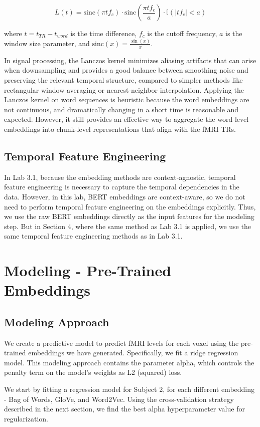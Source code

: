 \documentclass[10pt,letterpaper]{article}
\begin{document}
\[
L(t) = \text{sinc}(\pi t f_c) \cdot \text{sinc}(\frac{\pi t f_c}{a}) \cdot \mathbb{I}(|t f_c| < a)
\]

where \(t = t_{TR} - t_{word}\) is the time difference, $f_c$ is the cutoff frequency, $a$ is the window size parameter, and \(\text{sinc}(x) = \frac{\sin(x)}{x}\).

In signal processing, the Lanczos kernel minimizes aliasing artifacts that can arise when downsampling and provides a good balance between smoothing noise and preserving the relevant temporal structure, compared to simpler methods like rectangular window averaging or nearest-neighbor interpolation. Applying the Lanczos kernel on word sequences is heuristic because the word embeddings are not continuous, and dramatically changing in a short time is reasonable and expected. However, it still provides an effective way to aggregate the word-level embeddings into chunk-level representations that align with the fMRI TRs.

\subsection{Temporal Feature Engineering}
In Lab 3.1, because the embedding methods are context-agnostic, temporal feature engineering is necessary to capture the temporal dependencies in the data. However, in this lab, BERT embeddings are context-aware, so we do not need to perform temporal feature engineering on the embeddings explicitly. Thus, we use the raw BERT embeddings directly as the input features for the modeling step. But in Section 4, where the same method as Lab 3.1 is applied, we use the same temporal feature engineering methods as in Lab 3.1.

\section{Modeling - Pre-Trained Embeddings}

\subsection{Modeling Approach}
We create a predictive model to predict fMRI levels for each voxel using the pre-trained embeddings we have generated. Specifically, we fit a ridge regression model. This modeling approach contains the parameter alpha, which controls the penalty term on the model's weights as L2 (squared) loss.

We start by fitting a regression model for Subject 2, for each different embedding - Bag of Words, GloVe, and Word2Vec. Using the cross-validation strategy described in the next section, we find the best alpha hyperparameter value for regularization.
\end{document}
